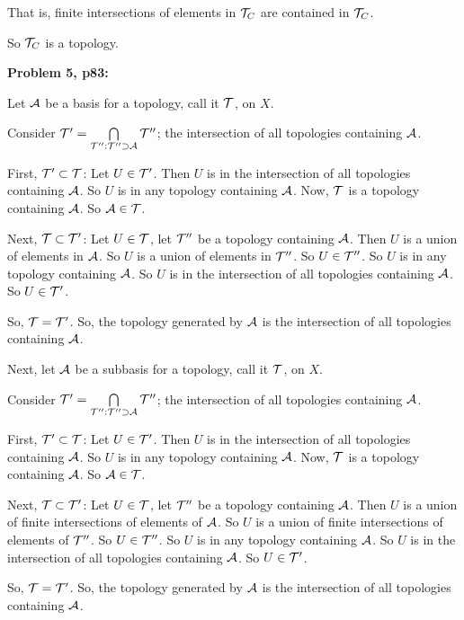 \documentclass[a4paper,12pt]{article}
\begin{document}
That is, finite intersections of elements in $\mathcal{T}_C$ are contained in $\mathcal{T}_C$.

So $\mathcal{T}_C$ is a topology.

\shunt

{\bf Problem 5, p83:}

Let $\mathcal{A}$ be a basis for a topology, call it $\mathcal{T}$, on $X$.

Consider $\mathcal{T}' = \bigcap\limits_{\mathcal{T}'': \mathcal{T}'' \supset \mathcal{A}} \mathcal{T}''$; the intersection of all topologies containing $\mathcal{A}$.

First, $\mathcal{T}' \subset \mathcal{T}$: Let $U \in \mathcal{T}'$. Then $U$ is in the intersection of all topologies containing $\mathcal{A}$. So $U$ is in any topology containing $\mathcal{A}$. Now, $\mathcal{T}$ is a topology containing $\mathcal{A}$. So $\mathcal{A} \in \mathcal{T}$.

Next, $\mathcal{T} \subset \mathcal{T}'$: Let $U \in \mathcal{T}$, let $\mathcal{T}''$ be a topology containing $\mathcal{A}$. Then $U$ is a union of elements in $\mathcal{A}$. So $U$ is a union of elements in $\mathcal{T}''$. So $U \in \mathcal{T}''$. So $U$ is in any topology containing $\mathcal{A}$. So $U$ is in the intersection of all topologies containing $\mathcal{A}$. So $U \in \mathcal{T}'$.

So, $\mathcal{T} = \mathcal{T}'$. So, the topology generated by $\mathcal{A}$ is the intersection of all topologies containing $\mathcal{A}$.


Next, let $\mathcal{A}$ be a subbasis for a topology, call it $\mathcal{T}$, on $X$.

Consider $\mathcal{T}' = \bigcap\limits_{\mathcal{T}'': \mathcal{T}'' \supset \mathcal{A}} \mathcal{T}''$; the intersection of all topologies containing $\mathcal{A}$.

First, $\mathcal{T}' \subset \mathcal{T}$: Let $U \in \mathcal{T}'$. Then $U$ is in the intersection of all topologies containing $\mathcal{A}$. So $U$ is in any topology containing $\mathcal{A}$. Now, $\mathcal{T}$ is a topology containing $\mathcal{A}$. So $\mathcal{A} \in \mathcal{T}$.

Next, $\mathcal{T} \subset \mathcal{T}'$: Let $U \in \mathcal{T}$, let $\mathcal{T}''$ be a topology containing $\mathcal{A}$.  Then $U$ is a union of finite intersections of elements of $\mathcal{A}$. So $U$ is a union of finite intersections of elements of $\mathcal{T}''$. So $U \in \mathcal{T}''$. So $U$ is in any topology containing $\mathcal{A}$. So $U$ is in the intersection of all topologies containing $\mathcal{A}$. So $U \in \mathcal{T}'$.

So, $\mathcal{T} = \mathcal{T}'$. So, the topology generated by $\mathcal{A}$ is the intersection of all topologies containing $\mathcal{A}$.
\end{document}
